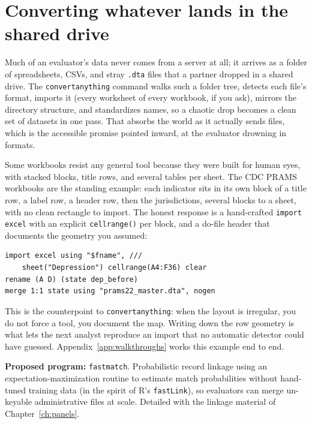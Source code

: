 \documentclass[
    a4paper,
    fontsize=10pt,
    twoside=true,
    numbers=noenddot,
]{kaobook}
\begin{document}
\section{Converting whatever lands in the shared drive}
Much of an evaluator's data never comes from a server at all; it arrives as a folder of spreadsheets, CSVs, and stray \texttt{.dta} files that a partner dropped in a shared drive. The \texttt{convertanything} command walks such a folder tree, detects each file's format, imports it (every worksheet of every workbook, if you ask), mirrors the directory structure, and standardizes names, so a chaotic drop becomes a clean set of datasets in one pass. That absorbs the world as it actually sends files, which is the accessible promise pointed inward, at the evaluator drowning in formats.

Some workbooks resist any general tool because they were built for human eyes, with stacked blocks, title rows, and several tables per sheet. The CDC PRAMS workbooks are the standing example: each indicator sits in its own block of a title row, a label row, a header row, then the jurisdictions, several blocks to a sheet, with no clean rectangle to import. The honest response is a hand-crafted \texttt{import excel} with an explicit \texttt{cellrange()} per block, and a do-file header that documents the geometry you assumed:
{\footnotesize
\begin{verbatim}
import excel using "$fname", ///
    sheet("Depression") cellrange(A4:F36) clear
rename (A D) (state dep_before)
merge 1:1 state using "prams22_master.dta", nogen
\end{verbatim}
}
This is the counterpoint to \texttt{convertanything}: when the layout is irregular, you do not force a tool, you document the map. Writing down the row geometry is what lets the next analyst reproduce an import that no automatic detector could have guessed. Appendix~\ref{app:walkthroughs} works this example end to end.

\begin{kaobox}[frametitle=Ado-file Idea: \texttt{fastmatch}]
\textbf{Proposed program:} \texttt{fastmatch}. Probabilistic record linkage using an expectation-maximization routine to estimate match probabilities without hand-tuned training data (in the spirit of R's \texttt{fastLink}), so evaluators can merge un-keyable administrative files at scale. Detailed with the linkage material of Chapter~\ref{ch:panels}.
\end{kaobox}
\end{document}
